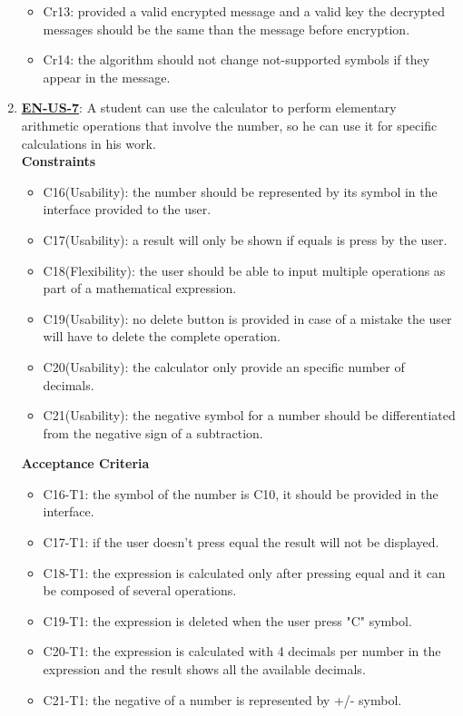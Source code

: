 \documentclass{report}
\begin{document}
\begin{enumerate}
\begin{itemize}
    \item Cr13: provided a valid encrypted message and a valid key the decrypted messages should be the same than the message before encryption.
    \item Cr14: the algorithm should not change not-supported symbols if they appear in the message.\newline
\end{itemize}

\item \underline{\textbf{EN-US-7}}: A student can use the calculator to perform elementary arithmetic operations that involve the number, so he can use it for specific calculations in his work. \\ \newline
\textbf{Constraints}
\begin{itemize}
    \item C16(Usability): the number should be represented by its symbol in the interface provided to the user. 
    \item C17(Usability): a result will only be shown if equals is press by the user. 
    \item C18(Flexibility): the user should be able to input multiple operations as part of a mathematical expression.
    \item C19(Usability): no delete button is provided in case of a mistake the user will have to delete the complete operation.
    \item C20(Usability): the calculator only provide an specific number of decimals.
    \item C21(Usability): the negative symbol for a number should be differentiated from the negative sign of a subtraction.
\end{itemize}

\textbf{Acceptance Criteria}
\begin{itemize}
    \item C16-T1: the symbol of the number is C10, it should be provided in the interface.
    \item C17-T1: if the user doesn't press equal the result will not be displayed.
    \item C18-T1: the expression is calculated only after pressing equal and it can be composed of several operations.
    \item C19-T1: the expression is deleted when the user press "C" symbol.
    \item C20-T1: the expression is calculated with 4 decimals per number in the expression and the result shows all the available decimals.
    \item C21-T1: the negative of a number is represented by +/- symbol.


\end{itemize}
\end{enumerate}
\end{document}
